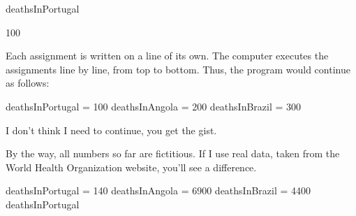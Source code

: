 \documentclass[letterpaper,10pt,english]{sphinxmanual}
\begin{document}
{
\begin{sphinxVerbatim}[commandchars=\\\{\}]
\llap{\color{nbsphinxin}[ ]:\,\hspace{\fboxrule}\hspace{\fboxsep}}
deathsInPortugal
\end{sphinxVerbatim}
}


{
\begin{sphinxVerbatim}[commandchars=\\\{\}]
\llap{\color{nbsphinxin}[ ]:\,\hspace{\fboxrule}\hspace{\fboxsep}}
100
\end{sphinxVerbatim}
}

Each assignment is written on a line of its own. The computer executes the assignments line by line, from top to bottom. Thus, the program would continue as follows:


{
\begin{sphinxVerbatim}[commandchars=\\\{\}]
\llap{\color{nbsphinxin}[ ]:\,\hspace{\fboxrule}\hspace{\fboxsep}}
deathsInPortugal = 100
deathsInAngola = 200
deathsInBrazil = 300
\end{sphinxVerbatim}
}

I don’t think I need to continue, you get the gist.

By the way, all numbers so far are fictitious. If I use real data, taken from the World Health Organization website, you’ll see a difference.


{
\begin{sphinxVerbatim}[commandchars=\\\{\}]
\llap{\color{nbsphinxin}[ ]:\,\hspace{\fboxrule}\hspace{\fboxsep}}
deathsInPortugal = 140
deathsInAngola = 6900
deathsInBrazil = 4400
deathsInPortugal
\end{sphinxVerbatim}
}
\end{document}
